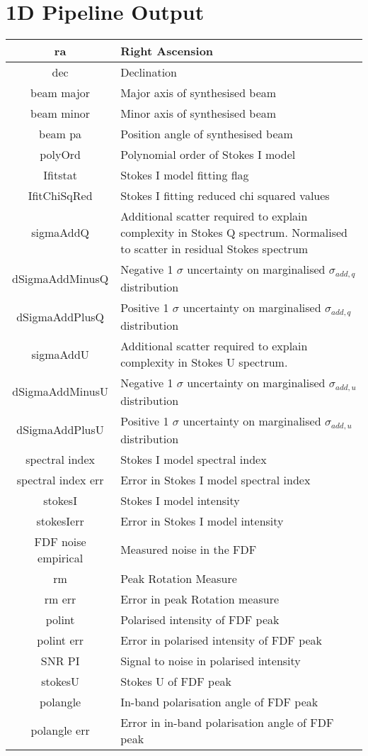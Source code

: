 
\chapter{1D Pipeline Output} %
\label{AppB: 1D Pipeline Output}

\begin{center}
\begin{tabular}{||c|p{10cm}||} 
\hline
ra & Right Ascension \\
\hline
dec & Declination \\
\hline
beam major & Major axis of synthesised beam \\
\hline
beam minor & Minor axis of synthesised beam \\
\hline
beam pa & Position angle of synthesised beam \\
\hline
polyOrd & Polynomial order of Stokes I model \\
\hline
Ifitstat & Stokes I model fitting flag \\
\hline
IfitChiSqRed & Stokes I fitting reduced chi squared values \\
\hline
sigmaAddQ & Additional scatter required to explain complexity in Stokes Q spectrum. Normalised to scatter in residual Stokes spectrum\\
\hline
dSigmaAddMinusQ & Negative 1 $\sigma$ uncertainty on marginalised $\sigma_{add,q}$ distribution \\
\hline
dSigmaAddPlusQ & Positive 1 $\sigma$ uncertainty on marginalised $\sigma_{add,q}$ distribution \\
\hline
sigmaAddU & Additional scatter required to explain complexity in Stokes U spectrum. \\
\hline 
dSigmaAddMinusU & Negative 1 $\sigma$ uncertainty on marginalised $\sigma_{add,u}$ distribution \\
\hline
dSigmaAddPlusU & Positive 1 $\sigma$ uncertainty on marginalised $\sigma_{add,u}$ distribution\\
\hline
spectral index & Stokes I model spectral index \\
\hline
spectral index err & Error in Stokes I model spectral index \\
\hline
stokesI & Stokes I model intensity \\
\hline
stokesIerr & Error in Stokes I model intensity \\
\hline
FDF noise empirical & Measured noise in the FDF \\
\hline
rm & Peak Rotation Measure \\
\hline
rm err & Error in peak Rotation measure \\
\hline
polint & Polarised intensity of FDF peak \\
\hline
polint err & Error in polarised intensity of FDF peak \\
\hline
SNR PI & Signal to noise in polarised intensity \\
\hline
stokesU & Stokes U of FDF peak \\
\hline
polangle & In-band polarisation angle of FDF peak \\
\hline
polangle err & Error in in-band polarisation angle of FDF peak \\
\hline


\end{tabular}
\end{center}
